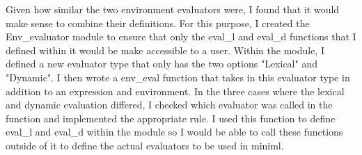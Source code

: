 \documentclass{article}
\begin{document}
Given how similar the two environment evaluators were, I found that it would make sense to combine their definitions. For this purpose, I created the Env\_evaluator module to ensure that only the eval\_l and eval\_d functions that I defined within it would be make accessible to a user. Within the module, I defined a new evaluator type that only has the two options "Lexical" and "Dynamic". I then wrote a env\_eval function that takes in this evaluator type in addition to an expression and environment. In the three cases where the lexical and dynamic evaluation differed, I checked which evaluator was called in the function and implemented the appropriate rule. I used this function to define eval\_l and eval\_d within the module so I would be able to call these functions outside of it to define the actual evaluators to be used in miniml.
\end{document}
